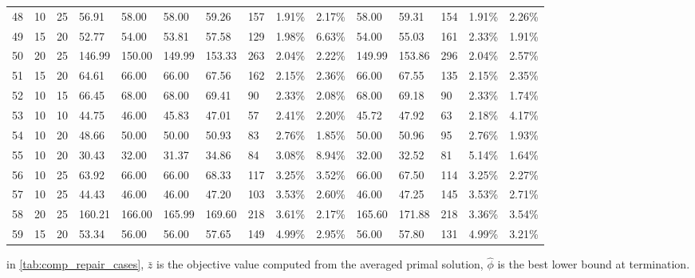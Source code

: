 \documentclass[
  a4paper,
,tablecaptionabove
]{scrartcl}
\begin{document}
\begin{longtable}{l|ll|ll|lllll|lllll}
  48 & 10                         & 25                         & 56.91                     & 58.00       & 58.00         & 59.26  & 157 & 1.91\%  & 2.17\% & 58.00  & 59.31  & 154 & 1.91\%  & 2.26\%  \\
  49 & 15                         & 20                         & 52.77                     & 54.00       & 53.81         & 57.58  & 129 & 1.98\%  & 6.63\% & 54.00  & 55.03  & 161 & 2.33\%  & 1.91\%  \\
  50 & 20                         & 25                         & 146.99                    & 150.00      & 149.99        & 153.33 & 263 & 2.04\%  & 2.22\% & 149.99 & 153.86 & 296 & 2.04\%  & 2.57\%  \\
  51 & 15                         & 20                         & 64.61                     & 66.00       & 66.00         & 67.56  & 162 & 2.15\%  & 2.36\% & 66.00  & 67.55  & 135 & 2.15\%  & 2.35\%  \\
  52 & 10                         & 15                         & 66.45                     & 68.00       & 68.00         & 69.41  & 90  & 2.33\%  & 2.08\% & 68.00  & 69.18  & 90  & 2.33\%  & 1.74\%  \\
  53 & 10                         & 10                         & 44.75                     & 46.00       & 45.83         & 47.01  & 57  & 2.41\%  & 2.20\% & 45.72  & 47.92  & 63  & 2.18\%  & 4.17\%  \\
  54 & 10                         & 20                         & 48.66                     & 50.00       & 50.00         & 50.93  & 83  & 2.76\%  & 1.85\% & 50.00  & 50.96  & 95  & 2.76\%  & 1.93\%  \\
  55 & 10                         & 20                         & 30.43                     & 32.00       & 31.37         & 34.86  & 84  & 3.08\%  & 8.94\% & 32.00  & 32.52  & 81  & 5.14\%  & 1.64\%  \\
  56 & 10                         & 25                         & 63.92                     & 66.00       & 66.00         & 68.33  & 117 & 3.25\%  & 3.52\% & 66.00  & 67.50  & 114 & 3.25\%  & 2.27\%  \\
  57 & 10                         & 25                         & 44.43                     & 46.00       & 46.00         & 47.20  & 103 & 3.53\%  & 2.60\% & 46.00  & 47.25  & 145 & 3.53\%  & 2.71\%  \\
  58 & 20                         & 25                         & 160.21                    & 166.00      & 165.99        & 169.60 & 218 & 3.61\%  & 2.17\% & 165.60 & 171.88 & 218 & 3.36\%  & 3.54\%  \\
  59 & 15                         & 20                         & 53.34                     & 56.00       & 56.00         & 57.65  & 149 & 4.99\%  & 2.95\% & 56.00  & 57.80  & 131 & 4.99\%  & 3.21\%  \\
  \bottomrule
\end{longtable}

in \ref{tab:comp_repair_cases}, $\bar z$ is the objective value computed from the averaged primal solution,
$\hat \phi$ is the best lower bound at termination.
\end{document}
